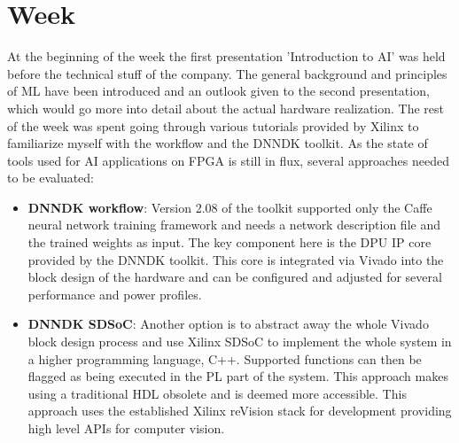 \chapter{Week}
At the beginning of the week the first presentation 'Introduction to \ac{AI}' was held before the technical stuff of the company. The general background and principles of \ac{ML} have been introduced and an outlook given to the second presentation, which would go more into detail about the actual hardware realization. The rest of the week was spent going through various tutorials provided by Xilinx to familiarize myself with the workflow and the \ac{DNNDK} toolkit. As the state of tools used for \ac{AI} applications on \ac{FPGA} is still in flux, several approaches needed to be evaluated:
\begin{itemize}
	\item \textbf{\ac{DNNDK} workflow}: Version 2.08 of the toolkit supported only the Caffe neural network training framework and needs a network description file and the trained weights as input. The key component here is the \ac{DPU} \ac{IP} core provided by the \ac{DNNDK} toolkit. This core is integrated via Vivado into the block design of the hardware and can be configured and adjusted for several performance and power profiles.
	\item \textbf{\ac{DNNDK} \ac{SDSoC}}: Another option is to abstract away the whole Vivado block design process and use Xilinx \ac{SDSoC} to implement the whole system in a higher programming language, C++. Supported functions can then be flagged as being executed in the \ac{PL} part of the system. This approach makes using a traditional \ac{HDL} obsolete and is deemed more accessible. This approach uses the established Xilinx reVision stack for development providing high level \acp{API} for computer vision.
\end{itemize}
